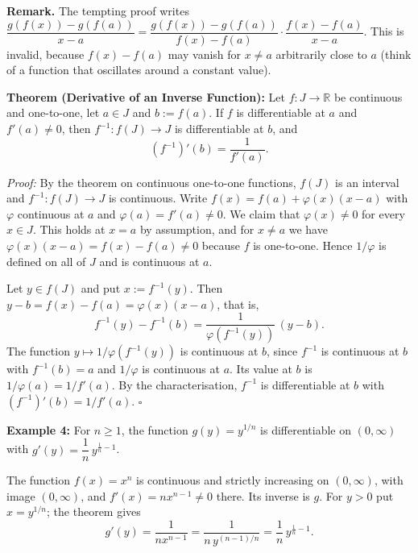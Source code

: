 \documentclass[a4paper,11pt,abstracton]{scrartcl}
\newcommand{\RR}{\mathbb{R}}
\theoremstyle{dotlessP}
\theoremstyle{dotlessS}
\theoremstyle{remark}
\theoremstyle{definition}
\begin{document}
\begin{remark_box}
\textbf{Remark.} The tempting proof writes $\dfrac{g(f(x))-g(f(a))}{x-a}=\dfrac{g(f(x))-g(f(a))}{f(x)-f(a)}\cdot\dfrac{f(x)-f(a)}{x-a}$. This is invalid, because $f(x)-f(a)$ may vanish for $x\ne a$ arbitrarily close to $a$ (think of a function that oscillates around a constant value). 
\end{remark_box}

\begin{problem_box}
\textbf{Theorem (Derivative of an Inverse Function):}
Let $f:J\to\RR$ be continuous and one-to-one, let $a\in J$ and $b:=f(a)$. If $f$ is differentiable at $a$ and $f'(a)\ne0$, then $f^{-1}:f(J)\to J$ is differentiable at $b$, and
\[
    \boxed{(f^{-1})'(b)=\frac1{f'(a)}.}
\]
\end{problem_box}

\begin{claim_box}
\textit{Proof:}
By the theorem on continuous one-to-one functions, $f(J)$ is an interval and $f^{-1}:f(J)\to J$ is continuous. Write $f(x)=f(a)+\varphi(x)(x-a)$ with $\varphi$ continuous at $a$ and $\varphi(a)=f'(a)\ne0$. We claim that $\varphi(x)\ne0$ for every $x\in J$. This holds at $x=a$ by assumption, and for $x\ne a$ we have $\varphi(x)(x-a)=f(x)-f(a)\ne0$ because $f$ is one-to-one. Hence $1/\varphi$ is defined on all of $J$ and is continuous at $a$.

Let $y\in f(J)$ and put $x:=f^{-1}(y)$. Then $y-b=f(x)-f(a)=\varphi(x)(x-a)$, that is,
\[
    f^{-1}(y)-f^{-1}(b)=\frac1{\varphi(f^{-1}(y))}\,(y-b).
\]
The function $y\mapsto1/\varphi(f^{-1}(y))$ is continuous at $b$, since $f^{-1}$ is continuous at $b$ with $f^{-1}(b)=a$ and $1/\varphi$ is continuous at $a$. Its value at $b$ is $1/\varphi(a)=1/f'(a)$. By the characterisation, $f^{-1}$ is differentiable at $b$ with $(f^{-1})'(b)=1/f'(a)$.
\hfill$\square$
\end{claim_box}

\begin{example_box}
\textbf{Example 4:} For $n\ge1$, the function $g(y)=y^{1/n}$ is differentiable on $(0,\infty)$ with $g'(y)=\dfrac1n\,y^{\frac1n-1}$.
\end{example_box}
\begin{example_claim_box}
The function $f(x)=x^n$ is continuous and strictly increasing on $(0,\infty)$, with image $(0,\infty)$, and $f'(x)=nx^{n-1}\ne0$ there. Its inverse is $g$. For $y>0$ put $x=y^{1/n}$; the theorem gives
\[
    g'(y)=\frac1{nx^{n-1}}=\frac1{n\,y^{(n-1)/n}}=\frac1n\,y^{\frac1n-1}.
\]
\end{example_claim_box}
\end{document}
